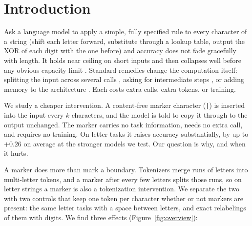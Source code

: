 \documentclass[10pt]{article} %
\begin{document}
\section{Introduction}
\label{sec:intro}

Ask a language model to apply a simple, fully specified rule to every character of a string (shift each letter forward, substitute through a lookup table, output the XOR of each digit with the one before) and accuracy does not fade gracefully with length. It holds near ceiling on short inputs and then collapses well before any obvious capacity limit \citep{hou2025focus}. Standard remedies change the computation itself: splitting the input across several calls \citep{zhou2023leasttomost}, asking for intermediate steps \citep{nye2021scratchpad, chen2023pot}, or adding memory to the architecture \citep{dai2019transformerxl, bulatov2022rmt, mohtashami2023landmark}. Each costs extra calls, extra tokens, or training.

We study a cheaper intervention. A content-free marker character (\texttt{|}) is inserted into the input every $k$ characters, and the model is told to copy it through to the output unchanged. The marker carries no task information, needs no extra call, and requires no training. On letter tasks it raises accuracy substantially, by up to $+0.26$ on average at the stronger models we test. Our question is why, and when it hurts.

A marker does more than mark a boundary. Tokenizers merge runs of letters into multi-letter tokens, and a marker after every few letters splits those runs, so on letter strings a marker is also a tokenization intervention. We separate the two with two controls that keep one token per character whether or not markers are present: the same letter tasks with a space between letters, and exact relabelings of them with digits. We find three effects (Figure~\ref{fig:overview}):
\end{document}
